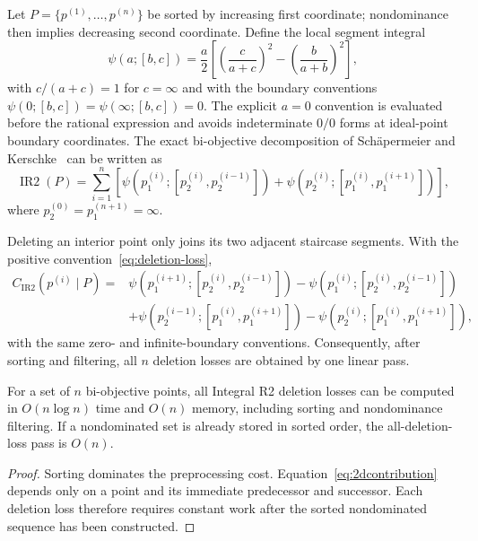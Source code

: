 \documentclass[runningheads]{llncs}
\newcommand{\IR}{\operatorname{IR2}}
\newcommand{\cIR}{C_{\IR}}
\begin{document}
Let $P=\{p^{(1)},\ldots,p^{(n)}\}$ be sorted by increasing first coordinate; nondominance then implies decreasing second coordinate. Define the local segment integral
\begin{equation}
\label{eq:psi}
\psi(a;[b,c])
=\frac{a}{2}
\left[
\left(\frac{c}{a+c}\right)^2
-\left(\frac{b}{a+b}\right)^2
\right],
\end{equation}
with $c/(a+c)=1$ for $c=\infty$ and with the boundary conventions $\psi(0;[b,c])=\psi(\infty;[b,c])=0$. The explicit $a=0$ convention is evaluated before the rational expression and avoids indeterminate $0/0$ forms at ideal-point boundary coordinates. The exact bi-objective decomposition of Sch\"apermeier and Kerschke~\cite{SchaepermeierKerschke2025} can be written as
\begin{equation}
\label{eq:ir2local}
\IR(P)=\sum_{i=1}^{n}
\left[
\psi\!\left(p^{(i)}_1;[p^{(i)}_2,p^{(i-1)}_2]\right)
+
\psi\!\left(p^{(i)}_2;[p^{(i)}_1,p^{(i+1)}_1]\right)
\right],
\end{equation}
where $p^{(0)}_2=p^{(n+1)}_1=\infty$.

Deleting an interior point only joins its two adjacent staircase segments. With the positive convention~\eqref{eq:deletion-loss},
\begin{align}
\cIR(p^{(i)}\mid P)
={}&
\psi\!\left(p^{(i+1)}_1;[p^{(i)}_2,p^{(i-1)}_2]\right)
-
\psi\!\left(p^{(i)}_1;[p^{(i)}_2,p^{(i-1)}_2]\right)
\nonumber\\
&+
\psi\!\left(p^{(i-1)}_2;[p^{(i)}_1,p^{(i+1)}_1]\right)
-
\psi\!\left(p^{(i)}_2;[p^{(i)}_1,p^{(i+1)}_1]\right),
\label{eq:2dcontribution}
\end{align}
with the same zero- and infinite-boundary conventions. Consequently, after sorting and filtering, all $n$ deletion losses are obtained by one linear pass.

\begin{proposition}
For a set of $n$ bi-objective points, all Integral R2 deletion losses can be computed in $O(n\log n)$ time and $O(n)$ memory, including sorting and nondominance filtering. If a nondominated set is already stored in sorted order, the all-deletion-loss pass is $O(n)$.
\end{proposition}

\begin{proof}
Sorting dominates the preprocessing cost. Equation~\eqref{eq:2dcontribution} depends only on a point and its immediate predecessor and successor. Each deletion loss therefore requires constant work after the sorted nondominated sequence has been constructed.
\end{proof}
\end{document}
